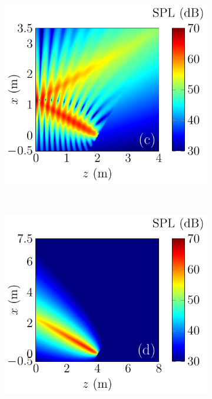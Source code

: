 \begin{figure}[!htb]
\begin{subfigure}{0.32\textwidth}
    \end{subfigure}
    \begin{subfigure}{0.32\textwidth}
        \centering
        \includegraphics[width = \textwidth]{fig/ComputePalReflectionTruncated_Ultra60000_LocSurface2m_Total_211013P.pdf}
    \end{subfigure}
    \\
    \begin{subfigure}{0.32\textwidth}
        \centering
        \includegraphics[width = \textwidth]{fig/ComputePalReflectionTruncated_Ultra60000_LocSurface4m_Orignal_211013Q.pdf}

\end{subfigure}
\end{figure}
